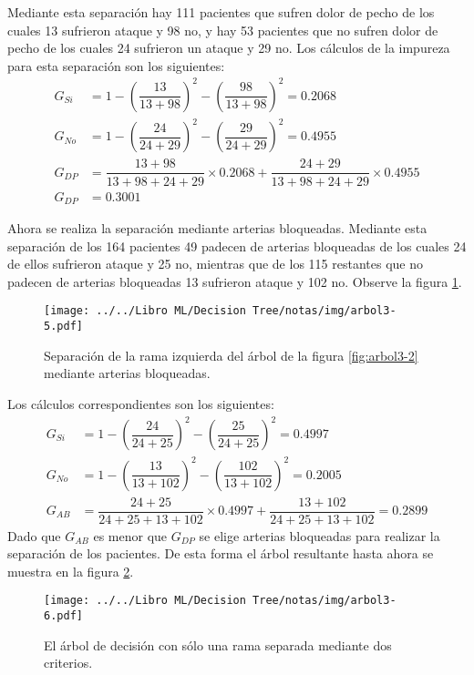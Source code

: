 \documentclass[
10pt, %
a4paper, %
]{article}
\begin{document}
Mediante esta separación hay 111 pacientes que sufren dolor de pecho de los cuales 13 sufrieron ataque y 98 no, y hay 53 pacientes que no sufren dolor de pecho de los 
cuales 24 sufrieron un ataque y 29 no. Los cálculos de la impureza para esta separación son los siguientes:
\begin{align*}
	G_{Si} &= 1 - \left(\dfrac{13}{13+98}\right)^2 - \left(\dfrac{98}{13+98}\right)^2 = 0.2068\\
	G_{No} &= 1 - \left(\dfrac{24}{24+29}\right)^2 - \left(\dfrac{29}{24+29}\right)^2 = 0.4955\\
	G_{DP} &= \dfrac{13+98}{13+98+24+29}\times 0.2068 + \dfrac{24+29}{13+98+24+29}\times 0.4955\\
	G_{DP} &= 0.3001
\end{align*}

Ahora se realiza la separación mediante arterias bloqueadas. Mediante esta separación de los 164 pacientes 49 padecen de arterias bloqueadas de los cuales 24 de ellos sufrieron 
ataque y 25 no, mientras que de los 115 restantes que no padecen de arterias bloqueadas 13 sufrieron ataque y 102 no. Observe la figura \ref{fig:arbol3-5}.
\begin{figure}[H]
	\centering
	\texttt{[image: ../../Libro ML/Decision Tree/notas/img/arbol3-5.pdf]}
	\caption{Separación de la rama izquierda del árbol de la figura \ref{fig:arbol3-2} mediante arterias bloqueadas.}
	\label{fig:arbol3-5}
\end{figure}
Los cálculos correspondientes son los siguientes:
\begin{align}
	\label{eq:impurezaABSi}
	G_{Si} &= 1 - \left(\dfrac{24}{24+25}\right)^2 - \left(\dfrac{25}{24+25}\right)^2 = 0.4997\\
	\label{eq:impurezaABNo}
	G_{No} &= 1 - \left(\dfrac{13}{13+102}\right)^2 - \left(\dfrac{102}{13+102}\right)^2 = 0.2005\\
	G_{AB} &= \dfrac{24+25}{24+25+13+102}\times 0.4997 + \dfrac{13+102}{24+25+13+102} = 0.2899\nonumber
\end{align}
Dado que $G_{AB}$ es menor que $G_{DP}$ se elige arterias bloqueadas para realizar la separación de los pacientes. De esta forma el árbol resultante hasta ahora se 
muestra en la figura \ref{fig:arbol3-6}.
\begin{figure}[H]
	\centering
	\texttt{[image: ../../Libro ML/Decision Tree/notas/img/arbol3-6.pdf]}
	\caption{El árbol de decisión con sólo una rama separada mediante dos criterios.}
	\label{fig:arbol3-6}
\end{figure}
\end{document}
